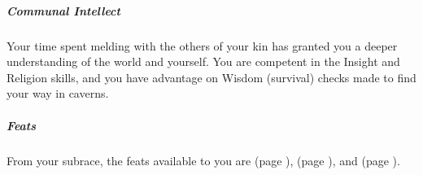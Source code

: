     \subparagraph{Communal Intellect} Your time spent melding with the others of your kin has granted you a deeper understanding of the world and yourself.
    You are competent in the Insight and Religion skills, and you have advantage on Wisdom (survival) checks made to find your way in caverns.

    \subparagraph{Feats} From your subrace, the feats available to you are
    \textbf{} (page \pageref{feat::}),
    \textbf{} (page \pageref{feat::}), and
    \textbf{} (page \pageref{feat::}).

\newpage
